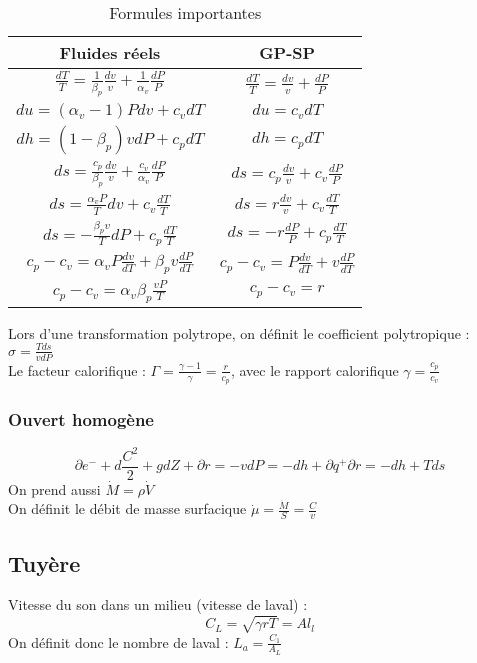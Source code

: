 \documentclass[../main.tex]{subfiles}
\begin{document}
\begin{table}[hbt!]
    \centering
    \begin{tabular}{c|c}
        Fluides réels & GP-SP \\
          \hline
        $\frac{dT}{T} = \frac{1}{\beta_p} \frac{dv}{v} + \frac{1}{\alpha_v}\frac{dP}{P}$ & $\frac{dT}{T} = \frac{dv}{v} + \frac{dP}{P}$\\
        $du = (\alpha_v - 1) Pdv + c_v dT$ & $du = c_v dT$\\
        $dh = (1-\beta_p)vdP + c_p dT$ & $dh = c_pdT$\\
        $ds = \frac{c_p}{\beta_p} \frac{dv}{v} + \frac{c_v}{\alpha_v}\frac{dP}{P}$ & $ds = c_p \frac{dv}{v} + c_v \frac{dP}{P}$\\
        $ds = \frac{\alpha_v P}{T} dv + c_v \frac{dT}{T}$ & $ds = r \frac{dv}{v}+ c_v \frac{dT}{T}$\\
        $ds = -\frac{\beta_p v}{T}dP + c_p \frac{dT}{T}$ & $ds = -r \frac{dP}{P} + c_p \frac{dT}{T}$\\
        $c_p - c_v = \alpha_v P \frac{dv}{dT} + \beta_p v \frac{dP}{dT}$ & $c_p - c_v = P\frac{dv}{dT}+v\frac{dP}{dT}$\\
        $c_p-c_v = \alpha_v \beta_p \frac{vP}{T}$ & $c_p-c_v = r$\\
    \end{tabular}
    \caption{Formules importantes}
\end{table}

Lors d'une transformation polytrope, on définit le coefficient polytropique : $\sigma = \frac{Tds}{vdP}$\\

Le facteur calorifique : $\Gamma = \frac{\gamma-1}{\gamma} = \frac{r}{c_p}$, avec le rapport calorifique $\gamma = \frac{c_p}{c_v}$\\

\subsubsection{Ouvert homogène}
\begin{equation}
    \partial e^- + d\frac{C^2}{2} + gdZ + \partial r = -vdP = -dh + \partial q^+\partial r = -dh + Tds
\end{equation}
On prend aussi $\dot{M} = \rho \dot{V}$\\
On définit le débit de masse surfacique $\dot{\mu} = \frac{\dot{M}}{S} = \frac{C}{v}$\\


\subsection{Tuyère}
Vitesse du son dans un milieu (vitesse de laval) : \\
\begin{equation}
    C_L = \sqrt{\gamma rT} = Al_l
\end{equation}
On définit donc le nombre de laval : $L_a = \frac{C_1}{A_L}$\\
\end{document}
